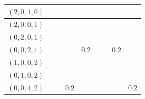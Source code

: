 \documentclass[11pt,letterpaper]{article}
\begin{document}
\begin{table}[]
\begin{tabular}{c||cccc||cccc}
$(2,0,1,0)$ & \multicolumn{1}{c|}{}                                                & \multicolumn{1}{c|}{}                         & \multicolumn{1}{c|}{\cellcolor{yellow!25}} &                          & \multicolumn{1}{c|}{\cellcolor{yellow!25}} & \multicolumn{1}{c|}{}                         & \multicolumn{1}{c|}{}                         &                          \\ \hline
$(2,0,0,1)$ & \multicolumn{1}{c|}{}                                                & \multicolumn{1}{c|}{}                         & \multicolumn{1}{c|}{}                         & \cellcolor{yellow!25} & \multicolumn{1}{c|}{\cellcolor{yellow!25}} & \multicolumn{1}{c|}{}                         & \multicolumn{1}{c|}{}                         &                          \\ \hline
$(0,2,0,1)$ & \multicolumn{1}{c|}{}                                                & \multicolumn{1}{c|}{}                         & \multicolumn{1}{c|}{}                         & \cellcolor{yellow!25} & \multicolumn{1}{c|}{}                         & \multicolumn{1}{c|}{\cellcolor{yellow!25}} & \multicolumn{1}{c|}{}                         &                          \\ \hline
$(0,0,2,1)$ & \multicolumn{1}{c|}{}                                                & \multicolumn{1}{c|}{}                         & \multicolumn{1}{c|}{}                         & \cellcolor{yellow!25}$0.2$ & \multicolumn{1}{c|}{}                         & \multicolumn{1}{c|}{}                         & \multicolumn{1}{c|}{\cellcolor{yellow!25}$0.2$} &                          \\ \hline
$(1,0,0,2)$ & \multicolumn{1}{c|}{\cellcolor{yellow!25}}                        & \multicolumn{1}{c|}{}                         & \multicolumn{1}{c|}{}                         &                          & \multicolumn{1}{c|}{}                         & \multicolumn{1}{c|}{}                         & \multicolumn{1}{c|}{}                         & \cellcolor{yellow!25} \\ \hline
$(0,1,0,2)$ & \multicolumn{1}{c|}{}                                                & \multicolumn{1}{c|}{\cellcolor{yellow!25}} & \multicolumn{1}{c|}{}                         &                          & \multicolumn{1}{c|}{}                         & \multicolumn{1}{c|}{}                         & \multicolumn{1}{c|}{}                         & \cellcolor{yellow!25} \\ \hline
$(0,0,1,2)$ & \multicolumn{1}{c|}{}                                                & \multicolumn{1}{c|}{}                         & \multicolumn{1}{c|}{\cellcolor{yellow!25}$0.2$} &                          & \multicolumn{1}{c|}{}                         & \multicolumn{1}{c|}{}                         & \multicolumn{1}{c|}{}                         & \cellcolor{yellow!25}$0.2$ \\ \hline

\end{tabular}
\end{table}
\end{document}
